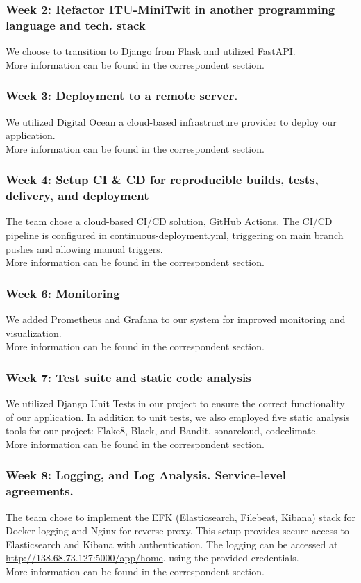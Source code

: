 \documentclass{article}
\begin{document}
        \subsubsection{Week 2: Refactor ITU-MiniTwit in another programming language and tech. stack}
            We choose to transition to Django from Flask and utilized FastAPI.\\
            More information can be found in the correspondent section.
        \subsubsection{Week 3: Deployment to a remote server.}
            We utilized Digital Ocean a cloud-based infrastructure provider to deploy our application.\\
            More information can be found in the correspondent section.
        \subsubsection{Week 4: Setup CI \& CD for reproducible builds, tests, delivery, and deployment }
            The team chose a cloud-based CI/CD solution, GitHub Actions. The CI/CD pipeline is configured in continuous-deployment.yml, triggering on main branch pushes and allowing manual triggers.\\
            More information can be found in the correspondent section.
        \subsubsection{Week 6: Monitoring}
            We added Prometheus and Grafana to our system for improved monitoring and visualization.\\
            More information can be found in the correspondent section.
        \subsubsection{Week 7: Test suite and static code analysis}
            We utilized Django Unit Tests in our project to ensure the correct functionality of our application. In addition to unit tests, we also employed five static analysis tools for our project: Flake8, Black, and Bandit, sonarcloud, codeclimate.\\
            More information can be found in the correspondent section.
        \subsubsection{Week 8: Logging, and Log Analysis. Service-level agreements.}
            The team chose to implement the EFK (Elasticsearch, Filebeat, Kibana) stack for Docker logging and Nginx for reverse proxy. This setup provides secure access to Elasticsearch and Kibana with authentication. The logging can be accessed at\\ \href{http://138.68.73.127:5000/app/home}{http://138.68.73.127:5000/app/home}. using the provided credentials.\\
            More information can be found in the correspondent section.
\end{document}
